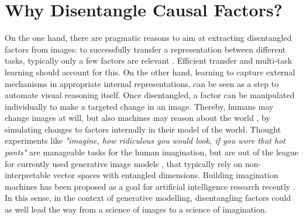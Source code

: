 \section{Why Disentangle Causal Factors?}
	On the one hand, there are pragmatic reasons to aim at extracting disentangled factors from images: to successfully transfer a representation between different tasks, typically only a few factors are relevant \cite{bengio13rep}.
	Efficient transfer and multi-task learning should account for this.
	On the other hand, learning to capture external mechanisms in appropriate internal representations, can be seen as a step to automate visual reasoning itself.
	Once disentangled, a factor can be manipulated individually to make a targeted change in an image. Thereby, humans may change images at will, but also machines may reason about the world \cite{pearl18impediments}, by simulating changes to factors internally in their model of the world.
	Thought experiments like \textit{"imagine, how ridiculous you would look, if you wore that hot pants"} are manageable tasks for the human imagination, but are out of the league for currently used generative image models \cite{goodfellow14gan, kingma13vae}, that typically rely on non-interpretable vector spaces with entangled dimensions.
	Building imagination machines has been proposed as a goal for artificial intelligence research recently \cite{mahadevan18imagine}.
	In this sense, in the context of generative modelling, disentangling factors could as well lead the way from a science of images to a science of imagination.

